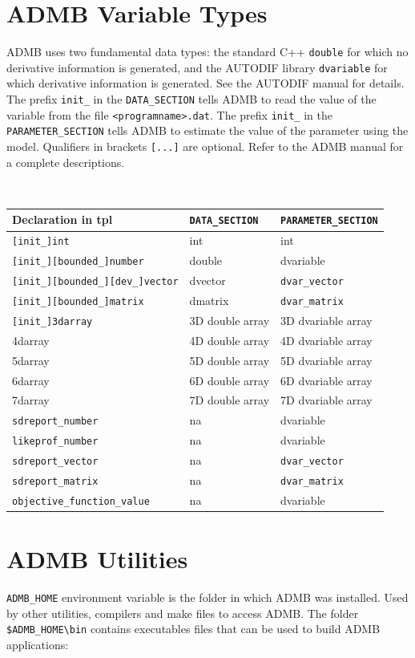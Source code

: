 \section{ADMB Variable Types}
ADMB uses two fundamental data types: the standard C++
\verb+double+ for which no derivative information is generated, and the
AUTODIF library \verb+dvariable+ for which derivative information is
generated. See the AUTODIF manual for details. The prefix
\verb+init_+ in the \verb+DATA_SECTION+ tells ADMB to read
the value of the variable from the file \verb+<programname>.dat+. The prefix
\verb+init_+ in the \verb+PARAMETER_SECTION+ tells ADMB to
estimate the value of the parameter using the model. Qualifiers in
brackets \verb+[...]+ are optional. Refer to the ADMB manual for a
complete descriptions.
{\scriptsize
\begin{center}
{\tt
\begin{tabular}{@{}lll@{}}
\hline
Declaration in tpl & \verb+DATA_SECTION+ & \verb+PARAMETER_SECTION+\\
\hline
\verb+[init_]int+ & int & int\\
\verb+[init_][bounded_]number+  & double & dvariable\\
\verb+[init_][bounded_][dev_]vector+ & dvector & \verb+dvar_vector+\\
\verb+[init_][bounded_]matrix+ & dmatrix & \verb+dvar_matrix+\\
\verb+[init_]3darray+ & 3D double array & 3D dvariable array\\
4darray & 4D double array & 4D dvariable array\\
5darray & 5D double array & 5D dvariable array\\
6darray & 6D double array & 6D dvariable array\\
7darray & 7D double array & 7D dvariable array\\
\verb+sdreport_number+ & na & dvariable\\
\verb+likeprof_number+ & na & dvariable\\
\verb+sdreport_vector+ & na & \verb+dvar_vector+\\
\verb+sdreport_matrix+ & na & \verb+dvar_matrix+\\
\verb|objective_function_value| & na & dvariable\\
\hline
\end{tabular}
}
\end{center}
}

\section {ADMB Utilities}
\verb+ADMB_HOME+ environment variable is the folder in which ADMB was
installed. Used by other utilities, compilers and make files to
access ADMB. The folder \verb+$ADMB_HOME\bin+ contains executables
files that can be used to build ADMB applications:

